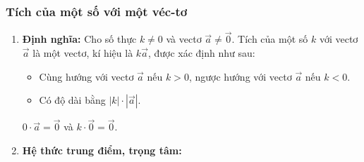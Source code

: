 \subsubsection{Tích của một số với một véc-tơ}
\begin{enumerate}[\iconMT]
	\item \textbf{Định nghĩa:} Cho số thực $k\ne 0$ và vectơ $\vec{a} \ne \vec{0}$. Tích của một số $k$ với vectơ $\vec{a}$ là một vectơ, kí hiệu là $k\vec{a}$, được xác định như sau:
	 \begin{itemize}
	 \item Cùng hướng với vectơ $\vec{a}$ nếu $k>0$, ngược hướng với vectơ $\vec{a}$ nếu $k<0$.
	 \item Có độ dài bằng $|k| \cdot |\vec{a}|$.
	 \end{itemize}
	 \begin{note}
	 $0\cdot \vec{a}=\vec{0}$ và $k\cdot \vec{0}=\vec{0}$.
	 \end{note}
	\item \textbf{Hệ thức trung điểm, trọng tâm:}
\end{enumerate}
